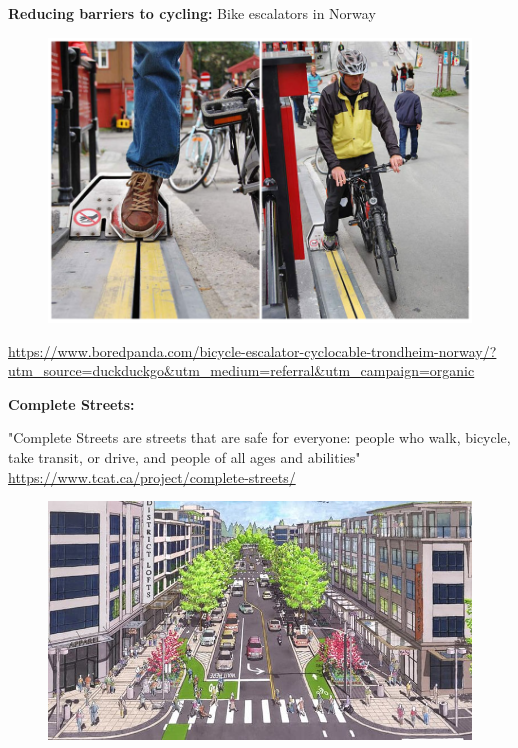 \documentclass[aspectratio=169]{beamer}
\begin{document}
\begin{frame}
	
	\textbf{Reducing barriers to cycling:} Bike escalators in Norway
	
	\begin{figure}
		\centering
		\includegraphics[width=0.85\linewidth]{images/norway_bike_escalator.png}
	\end{figure}
	
	\tiny\url{https://www.boredpanda.com/bicycle-escalator-cyclocable-trondheim-norway/?utm_source=duckduckgo&utm_medium=referral&utm_campaign=organic}
	
\end{frame}





\begin{frame}
	
	\textbf{Complete Streets:} 
	
	\vspace{4mm}
	
	{"Complete Streets are streets that are safe for everyone: people who walk, bicycle, take transit, or drive, and people of all ages and abilities"}
	\tiny\url{https://www.tcat.ca/project/complete-streets/}
	
	\begin{figure}
		\centering
		\includegraphics[width=0.65\linewidth]{images/complete_street_drawing.jpg}
	\end{figure}
	
\end{frame}
\end{document}
